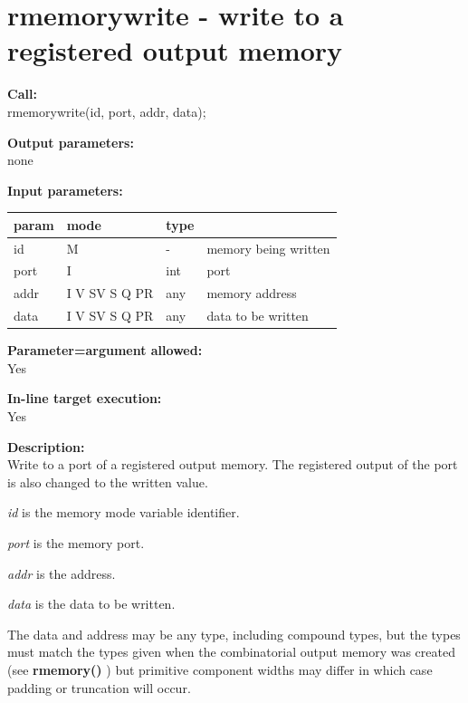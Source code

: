     \section{rmemorywrite - write to a registered output memory}\label{sec:iprmemorywrite}
        
        {\bf Call:} \\
        rmemorywrite(id, port, addr, data);
        
        {\bf Output parameters:} \\
        none
        
        {\bf Input parameters:} \\
        \begin{tabular}{| l | l | l | l |}
        \hline
        param  & mode     & type  & \\
        \hline \hline
        id   & M             &  -  & memory being written   \\ \hline
        port & I             & int & port                   \\ \hline
        addr & I V SV S Q PR & any & memory address         \\ \hline
        data & I V SV S Q PR & any & data to be written     \\ \hline
        \end{tabular}
        
        {\bf Parameter=argument allowed:} \\
        Yes
        
        {\bf In-line target execution:} \\
        Yes
        
        {\bf Description:} \\
        Write to a port of a registered output memory. The registered output
        of the port is also changed to the written value.

        {\em id} is the memory mode variable identifier.

        {\em port} is the memory port.

        {\em addr} is the address.

        {\em data} is the data to be written.
        
        The data and address may be any type, including compound types, but
        the types must match the types given when the combinatorial
        output memory was created (see {\bf rmemory()} ) but
        primitive component widths may differ in which case padding or
        truncation will occur.
        
